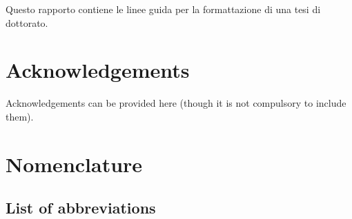 \documentclass[12pt,a4paper,twoside, openright]{report}
\let\oldchapter\chapter
\renewcommand{\chapter}[1]{
	\oldchapter{#1}
	\thispagestyle{empty}
}
\begin{document}
	Questo rapporto contiene le linee guida per la formattazione di una tesi di dottorato.

	\newpage
	
	\oldchapter*{Acknowledgements}
	
	Acknowledgements can be provided here (though it is not compulsory to include them).

	\newpage
	
	
	\glsunsetall  %
	
	\tableofcontents
	
	\newpage
	
	\listoffigures
	
	\newpage
	
	\listoftables
	
	\newpage
	
	\glsresetall  %
	
	\oldchapter*{Nomenclature}
	
	\section*{List of abbreviations}
	
	\vspace{-1cm} %
	\renewcommand*{\glossarysection}[2][]{\section*{#2}}
	\printglossary[type=\acronymtype, title={}, toctitle={}, style=long, nogroupskip, nonumberlist]
	
	
\end{document}
